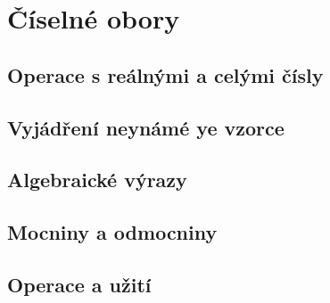
\newpage
    \section{Číselné obory}

        \subsection{Operace s reálnými a celými čísly}
        \subsection{Vyjádření neynámé ye vzorce}
        \subsection{Algebraické výrazy}
        \subsection{Mocniny a odmocniny}
        \subsection{Operace a užití}



